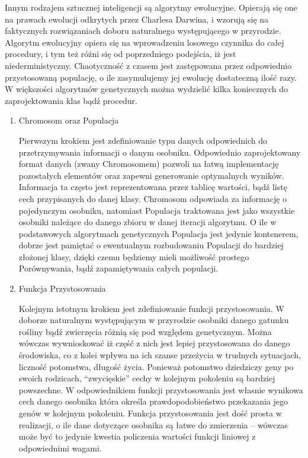 \begin{par}
Innym rodzajem sztucznej inteligencji są algorytmy ewolucyjne.
Opierają się one na prawach ewolucji odkrytych przez Charlesa Darwina, i wzorują się na faktycznych rozwiązaniach doboru naturalnego występującego w przyrodzie.
Algorytm ewolucyjny opiera się na wprowadzeniu losowego czynnika do całej procedury, i tym też różni się od poprzedniego podejścia, iż jest niederministyczny. 
Chaotyczność z czasem jest zastępowana przez odpowiednio przystosowaną populację, o ile zasymulujemy jej ewolucję dostateczną ilość razy. 
W większości algorytmów genetycznych można wydzielić kilka koniecznych do zaprojektowania klas bądź procedur.
\begin{enumerate}
\item Chromosom oraz Populacja
	\begin{par}
		Pierwszym krokiem jest zdefiniowanie typu danych odpowiednich do przetrzymywania informacji o danym osobniku.
		Odpowiednio zaprojektowany format danych (zwany Chromosomem) pozwoli na łatwą implementację pozostałych elementów oraz zapewni generowanie optymalnych wyników.
		Informacja ta często jest reprezentowana przez tablicę wartości, bądź listę cech przypisanych do danej klasy. 
		Chromosom odpowiada za informację o pojedynczym osobniku, natomiast Populacja traktowana jest jako wszystkie osobniki należące do danego zbioru w danej iteracji algorytmu. O ile w podstawowych algorytmach genetycznych Populacja jest jedynie kontenerem, dobrze jest pamiętać o ewentualnym rozbudowaniu Populacji do bardziej złożonej klasy, dzięki czemu będziemy mieli możliwość prostego Porównywania, bądź zapamiętywania całych populacji.
	\end{par}
\item Funkcja Przystosowania
	\begin{par}
		Kolejnym istotnym krokiem jest zdefiniowanie funkcji przystosowania.
		W doborze naturalnym występującym w przyrodzie osobniki danego gatunku rośliny bądź zwierzęcia różnią się pod względem genetycznym. 
		Można wówczas wywnioskować iż część z nich jest lepiej przystosowana do danego środowiska, co z kolei wpływa na ich szanse przeżycia w trudnych sytuacjach, liczność potomstwa, długość życia.
		Ponieważ potomstwo dziedziczy geny po swoich rodzicach, ``zwycięskie'' cechy w kolejnym pokoleniu są bardziej powszechne.
		W odpowiednikiem funkcji przystosowania jest własnie wynikowa cech danego osobnika która określa prawdopodobieństwo przekazania jego genów w kolejnym pokoleniu.
		Funkcja przystosowania jest dość prosta w realizacji, o ile dane dotyczące osobnika są łatwe do zmierzenia -- wówczas może być to jedynie kwestia policzenia wartości funkcji liniowej z odpowiednimi wagami.

\end{par}
\end{enumerate}
\end{par}
